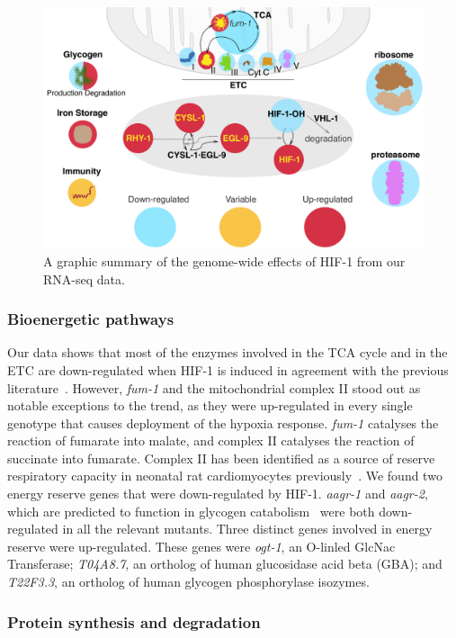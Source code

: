 \documentclass[9pt,twocolumn,twoside]{pnas-new}
\newcommand{\gene}[1]{\emph{#1}}
\newcommand{\hifp}{HIF-1}
\begin{document}
\begin{figure}[tbhp]
\centering
\includegraphics[width=\linewidth]{figs/hif1genomewide.pdf}
\caption{
A graphic summary of the genome-wide effects of \hifp{} from our RNA-seq data.
}
\label{fig:genomewide}
\end{figure}

\subsubsection{Bioenergetic pathways}
Our data shows that most of the enzymes involved in the TCA cycle and in the ETC
are down-regulated when \hifp{} is induced in agreement with the previous
literature~\cite{Semenza2012}.
However, \gene{fum-1} and the mitochondrial complex II stood out as notable
exceptions to the trend, as they were up-regulated in every single genotype that
causes deployment of the hypoxia response. \gene{fum-1} catalyses the reaction
of fumarate into malate, and complex II catalyses the reaction of succinate into
fumarate. Complex II has been identified as a source of reserve respiratory
capacity in neonatal rat cardiomyocytes previously~\cite{Pfleger2015}.
We found two energy reserve genes that were down-regulated by \hifp{}.
\gene{aagr-1} and \gene{aagr-2}, which are predicted to function in glycogen
catabolism~\cite{Sikora2010} were both down-regulated in all the relevant mutants.
Three distinct genes involved in energy reserve were up-regulated. These genes were
\gene{ogt-1}, an O-linled GlcNac Transferase; \gene{T04A8.7}, an ortholog of human
glucosidase acid beta (GBA); and \gene{T22F3.3}, an ortholog of human glycogen
phosphorylase isozymes.

\subsubsection{Protein synthesis and degradation}
\end{document}
